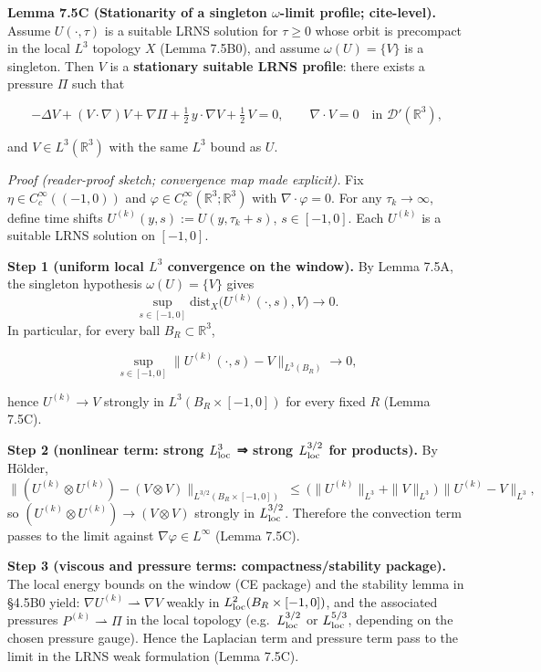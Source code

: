 \documentclass[
  11pt,
]{article}
\begin{document}
\textbf{Lemma 7.5C (Stationarity of a singleton \(\omega\)-limit profile; cite-level).} Assume \(U(\cdot,\tau)\) is a suitable LRNS solution for \(\tau\ge 0\) whose orbit is precompact in the local \(L^3\) topology \(X\) (Lemma 7.5B0), and assume \(\omega(U)=\{V\}\) is a singleton. Then \(V\) is a \textbf{stationary suitable LRNS profile}: there exists a pressure \(\Pi\) such that

\begin{equation}
-\Delta V + (V\cdot\nabla)V + \nabla \Pi + \tfrac12\,y\cdot\nabla V + \tfrac12\,V = 0,\qquad \nabla\cdot V=0
\quad\text{in }\mathcal D'(\mathbb R^3),
\tag{7.23}\label{eq:7_23_stationary_LRNS}
\end{equation}

and \(V\in L^3(\mathbb R^3)\) with the same \(L^3\) bound as \(U\).

\emph{Proof (reader-proof sketch; convergence map made explicit).} Fix \(\eta\in C_c^\infty((-1,0))\) and \(\varphi\in C_c^\infty(\mathbb R^3;\mathbb R^3)\) with \(\nabla\cdot\varphi=0\). For any \(\tau_k\to\infty\), define time shifts \(U^{(k)}(y,s):=U(y,\tau_k+s)\), \(s\in[-1,0]\). Each \(U^{(k)}\) is a suitable LRNS solution on \([-1,0]\).

\textbf{Step 1 (uniform local \(L^3\) convergence on the window).} By Lemma 7.5A, the singleton hypothesis \(\omega(U)=\{V\}\) gives \[
\sup_{s\in[-1,0]}\mathrm{dist}_X\!\big(U^{(k)}(\cdot,s),V\big)\to 0.
\] In particular, for every ball \(B_R\subset\mathbb R^3\),

\begin{equation}
\sup_{s\in[-1,0]}\|U^{(k)}(\cdot,s)-V\|_{L^3(B_R)}\to 0,
\tag{7.5C.1}\label{eq:7_5C_L3loc_uniform}
\end{equation}

hence \(U^{(k)}\to V\) strongly in \(L^3(B_R\times[-1,0])\) for every fixed \(R\) (Lemma 7.5C).

\textbf{Step 2 (nonlinear term: strong \(L^3_{\rm loc}\) ⇒ strong \(L^{3/2}_{\rm loc}\) for products).} By Hölder, \[
\|(U^{(k)}\otimes U^{(k)})-(V\otimes V)\|_{L^{3/2}(B_R\times[-1,0])}
\ \le\ \big(\|U^{(k)}\|_{L^3}+\|V\|_{L^3}\big)\,\|U^{(k)}-V\|_{L^3},
\] so \((U^{(k)}\otimes U^{(k)})\to(V\otimes V)\) strongly in \(L^{3/2}_{\rm loc}\). Therefore the convection term passes to the limit against \(\nabla\varphi\in L^\infty\) (Lemma 7.5C).

\textbf{Step 3 (viscous and pressure terms: compactness/stability package).} The local energy bounds on the window (CE package) and the stability lemma in §4.5B0 yield: \(\nabla U^{(k)}\rightharpoonup \nabla V\) weakly in \(L^2_{\rm loc}(B_R\times[-1,0])\), and the associated pressures \(P^{(k)}\rightharpoonup \Pi\) in the local topology (e.g.~\(L^{3/2}_{\rm loc}\) or \(L^{5/3}_{\rm loc}\), depending on the chosen pressure gauge). Hence the Laplacian term and pressure term pass to the limit in the LRNS weak formulation (Lemma 7.5C).
\end{document}
